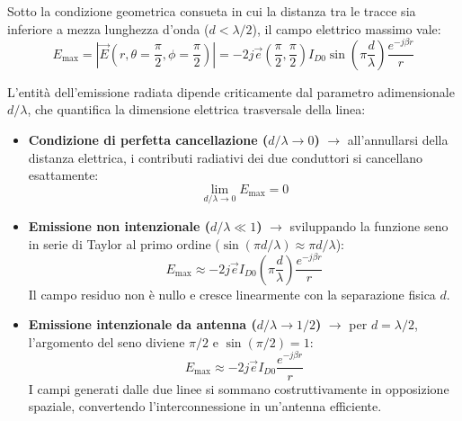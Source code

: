 Sotto la condizione geometrica consueta in cui la distanza tra le tracce sia inferiore a mezza lunghezza d'onda ($d < \lambda/2$), il campo elettrico massimo vale:
\[
E_{\text{max}} = \left| \vec{E}\left(r, \theta = \frac{\pi}{2}, \phi = \frac{\pi}{2}\right) \right| = -2j \vec{e}\left(\frac{\pi}{2}, \frac{\pi}{2}\right) I_{D0} \sin\left(\pi \frac{d}{\lambda}\right) \frac{e^{-j \beta r}}{r}
\]

L'entità dell'emissione radiata dipende criticamente dal parametro adimensionale $d/\lambda$, che quantifica la dimensione elettrica trasversale della linea:
\begin{itemize}
    \item \textbf{Condizione di perfetta cancellazione ($d/\lambda \to 0$)} $\rightarrow$ all'annullarsi della distanza elettrica, i contributi radiativi dei due conduttori si cancellano esattamente:
    \[
    \lim_{d/\lambda \to 0} E_{\text{max}} = 0
    \]
    \item \textbf{Emissione non intenzionale ($d/\lambda \ll 1$)} $\rightarrow$ sviluppando la funzione seno in serie di Taylor al primo ordine ($\sin(\pi d/\lambda) \approx \pi d/\lambda$):
    \[
    E_{\text{max}} \approx -2j \vec{e} I_{D0} \left(\pi \frac{d}{\lambda}\right) \frac{e^{-j \beta r}}{r}
    \]
    Il campo residuo non è nullo e cresce linearmente con la separazione fisica $d$.
    \item \textbf{Emissione intenzionale da antenna ($d/\lambda \to 1/2$)} $\rightarrow$ per $d = \lambda/2$, l'argomento del seno diviene $\pi/2$ e $\sin(\pi/2) = 1$:
    \[
    E_{\text{max}} \approx -2j \vec{e} I_{D0} \frac{e^{-j \beta r}}{r}
    \]
    I campi generati dalle due linee si sommano costruttivamente in opposizione spaziale, convertendo l'interconnessione in un'antenna efficiente.
\end{itemize}

